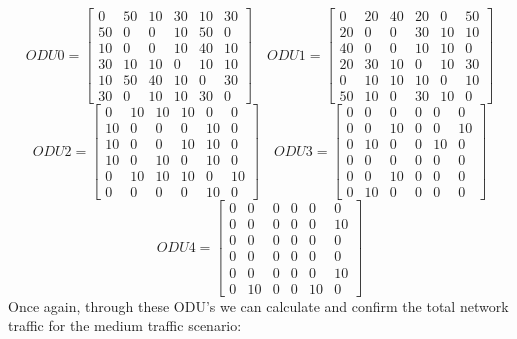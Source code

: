 \[
ODU0=
  \begin{bmatrix}
    0 & 50 & 10 & 30 & 10 & 30 \\
    50 & 0 & 0 & 10 & 50 & 0 \\
    10 & 0 & 0 & 10 & 40 & 10 \\
    30 & 10 & 10 & 0 & 10 & 10 \\
    10 & 50 & 40 & 10 & 0 & 30 \\
    30 & 0 & 10 & 10 & 30 & 0
  \end{bmatrix}
\quad ODU1=
  \begin{bmatrix}
    0 & 20 & 40 & 20 & 0 & 50 \\
    20 & 0 & 0 & 30 & 10 & 10 \\
    40 & 0 & 0 & 10 & 10 & 0 \\
    20 & 30 & 10 & 0 & 10 & 30 \\
    0 & 10 & 10 & 10 & 0 & 10 \\
    50 & 10 & 0 & 30 & 10 & 0
  \end{bmatrix}
\]
\[
ODU2=
  \begin{bmatrix}
    0 & 10 & 10 & 10 & 0 & 0 \\
    10 & 0 & 0 & 0 & 10 & 0 \\
    10 & 0 & 0 & 10 & 10 & 0 \\
    10 & 0 & 10 & 0 & 10 & 0 \\
    0 & 10 & 10 & 10 & 0 & 10 \\
    0 & 0 & 0 & 0 & 10 & 0
  \end{bmatrix}
\quad ODU3=
  \begin{bmatrix}
    0 & 0 & 0 & 0 & 0 & 0 \\
    0 & 0 & 10 & 0 & 0 & 10 \\
    0 & 10 & 0 & 0 & 10 & 0 \\
    0 & 0 & 0 & 0 & 0 & 0 \\
    0 & 0 & 10 & 0 & 0 & 0 \\
    0 & 10 & 0 & 0 & 0 & 0
  \end{bmatrix}
\]
\[
ODU4=
  \begin{bmatrix}
    0 & 0 & 0 & 0 & 0 & 0 \\
    0 & 0 & 0 & 0 & 0 & 10 \\
    0 & 0 & 0 & 0 & 0 & 0 \\
    0 & 0 & 0 & 0 & 0 & 0 \\
    0 & 0 & 0 & 0 & 0 & 10 \\
    0 & 10 & 0 & 0 & 10 & 0
  \end{bmatrix}
\]
\newpage
Once again, through these ODU's we can calculate and confirm the total network traffic for the medium traffic scenario:\\

